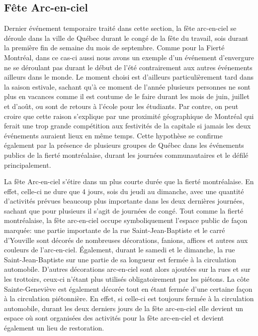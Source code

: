 \subsection{Fête Arc-en-ciel}
\label{subsec:fetearcenciel}
Dernier événement temporaire traité dans cette section, la fête arc-en-ciel se déroule dans la ville de Québec durant le congé de la fête du travail, sois durant la première fin de semaine du mois de septembre.
Comme pour la Fierté Montréal, dans ce cas-ci aussi nous avons un exemple d'un événement d'envergure ne se déroulant pas durant le début de l'été contrairement aux autres événements ailleurs dans le monde.
Le moment choisi est d'ailleurs particulièrement tard dans la saison estivale, sachant qu'à ce moment de l'année plusieurs personnes ne sont plus en vacances comme il est coutume de le faire durant les mois de juin, juillet et d'août, ou sont de retours à l'école pour les étudiants.
Par contre, on peut croire que cette raison s'explique par une proximité géographique de Montréal qui ferait une trop grande compétition aux festivités de la capitale si jamais les deux événements auraient lieux en même temps.
Cette hypothèse se confirme également par la présence de plusieurs groupes de Québec dans les événements publics de la fierté montréalaise, durant les journées communautaires et le défilé principalement.

La fête Arc-en-ciel s'étire dans un plus courte durée que la fierté montréalaise.
En effet, celle-ci ne dure que 4 jours, sois du jeudi au dimanche, avec une quantité d'activités prévues beaucoup plus importante dans les deux dernières journées, sachant que pour plusieurs il s'agit de journées de congé.
Tout comme la fierté montréalaise, la fête arc-en-ciel occupe symboliquement l'espace public de façon marquée: une partie importante de la rue Saint-Jean-Baptiste et le carré d'Youville sont décorés de nombreuses décorations, fanions, affices et autres aux couleurs de l'arc-en-ciel.
Également, durant le samedi et le dimanche, la rue Saint-Jean-Baptiste sur une partie de sa longueur est fermée à la circulation automobile.
D'autres décorations arc-en-ciel sont alors ajoutées sur la rues et sur les trottoirs, ceux-ci n'étant plus utilisés obligatoirement par les piétons.
La côte Sainte-Geneviève est également décorée tout en étant fermée d'une certaine façon à la circulation piétonnière.
En effet, si celle-ci est toujours fermée à la circulation automobile, durant les deux derniers jours de la fête arc-en-ciel elle devient un espace où sont organisées des activités pour la fête arc-en-ciel et devient également un lieu de restoration.

